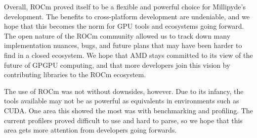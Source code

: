 \quad Overall, ROCm proved itself to be a flexible and powerful choice for Millipyde's development. The benefits to cross-platform development are undeniable, and we hope that this becomes the norm for GPU tools and ecosystems going forward. The open nature of the ROCm community allowed us to track down many implementation nuances, bugs, and future plans that may have been harder to find in a closed ecosystem. We hope that AMD stays committed to its view of the future of GPGPU computing, and that more developers join this vision by contributing libraries to the ROCm ecosystem. 

\quad The use of ROCm was not without downsides, however. Due to its infancy, the tools available may not be as powerful as equivalents in environments such as CUDA. One area this showed the most was with benchmarking and profiling. The current profilers proved difficult to use and hard to parse, so we hope that this area gets more attention from developers going forwards.


